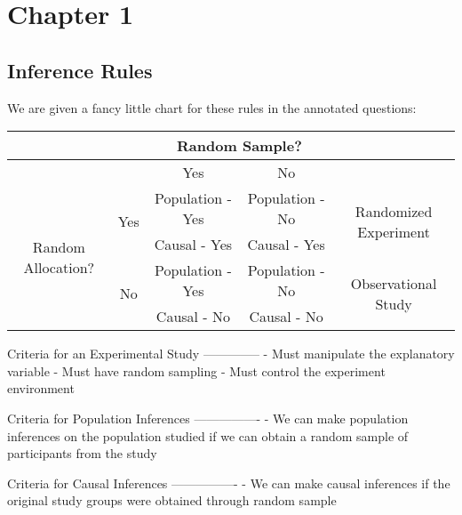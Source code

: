 \documentclass{article}
\title{\titletext}
\author{\authortext}
\theoremstyle{plain}
\theoremstyle{definition}
\theoremstyle{definition}
\begin{document}
\section{Chapter 1}
\subsection{Inference Rules}
We are given a fancy little chart for these rules in the annotated questions:\\
\begin{tabular}{|c|c|c|c|c|}
                        \hline&&\multicolumn{2}{c|}{Random Sample?}&\\
                        \hline&& Yes & No &\\
    \hline\multirow{4}{*}{Random Allocation?}&\multirow{2}{*}{Yes}&Population - Yes & Population - No & \multirow{2}{*}{Randomized Experiment}\\
    && Causal - Yes & Causal - Yes&\\
    &\multirow{2}{*}{No}\hline&Population - Yes & Population - No & \multirow{2}{*}{Observational Study}\\
    && Causal - No & Causal - No&\\
    \hline
\end{tabular}
\begin{markdown}
Criteria for an Experimental Study
--------------
- Must manipulate the explanatory variable
- Must have random sampling
- Must control the experiment environment

Criteria for Population Inferences
----------------
- We can make population inferences on the population studied if we can obtain a random sample of participants from the study

Criteria for Causal Inferences
----------------
- We can make causal inferences if the original study groups were obtained through random sample

\end{markdown}
\end{document}

